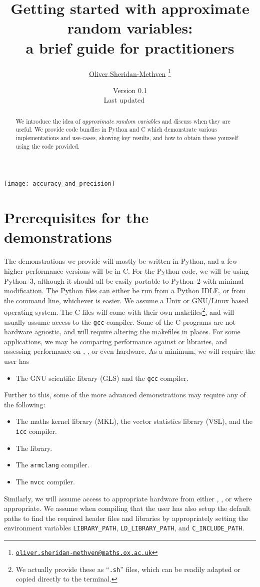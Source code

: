 \documentclass[11pt,a4paper,twoside,english]{extarticle}
\title{\bfseries Getting started with approximate random variables:\\[0.5em] a brief guide for practitioners}
\author{\href{mailto:oliver.sheridan-methven@maths.ox.ac.uk}{Oliver Sheridan-Methven}%
\thanks{\href{mailto:oliver.sheridan-methven@maths.ox.ac.uk}%
{\texttt{oliver.sheridan-methven@maths.ox.ac.uk}}}
}
\date{Version 0.1\\[1em]
Last updated \datedayname\ \nth{\number\day} \monthname\  \number\year}
\begin{document}
\pagestyle{empty}
\maketitle
{}

\begin{abstract}
We introduce the idea of \emph{approximate random variables} and discuss when they are useful. We provide code bundles in Python and C which demonstrate various implementations and use-cases, showing key results, and how to obtain these yourself using the code provided.  
\end{abstract}


\vfill
\centerline{\texttt{[image: accuracy\_and\_precision]}}
\vfill

\clearpage
\tableofcontents
\cleardoublepage
{}
\pagestyle{fancy}

\clearpage
\section{Prerequisites for the demonstrations}

The demonstrations we provide will mostly be written in Python, and a few higher performance versions will be in C. For the Python code, we will be using Python~3, although it should all be easily portable to Python~2 with minimal modification. The Python files can either be run from a Python IDLE, or from the command line, whichever is easier. We assume a Unix or GNU/Linux based operating system. The C files will come with their own makefiles\footnote{We actually provide these as ``\verb|.sh|'' files, which can be readily adapted or copied directly to the terminal.}, and will usually assume access to the \texttt{gcc} compiler. Some of the C programs are not hardware agnostic, and will require altering the makefiles in places. For some applications, we may be comparing performance against \intel or \nag libraries, and assessing performance on \intel, \arm, or even \nvidia hardware. As a minimum, we will require the user has 
\begin{itemize}
\item The GNU scientific library (GLS) and the \texttt{gcc} compiler.
\end{itemize}
Further to this, some of the more advanced demonstrations may require any of the following:
\begin{itemize}
\item The \intel maths kernel library (MKL), the vector statistics library (VSL), and the \texttt{icc} compiler. 
\item The \nag library. 
\item The \arm \texttt{armclang} compiler.
\item The \nvidia \texttt{nvcc} compiler.
\end{itemize} 
Similarly, we will assume access to appropriate hardware from either \intel, \arm, or \nvidia where appropriate. We assume when compiling that the user has also setup the default paths to find the required header files and libraries by appropriately setting the environment variables \verb|LIBRARY_PATH|, \verb|LD_LIBRARY_PATH|, and \verb|C_INCLUDE_PATH|.
\end{document}

